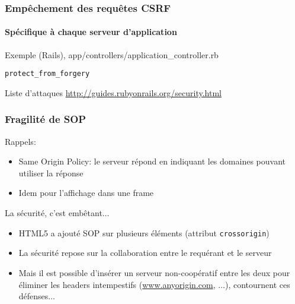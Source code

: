 \begin{reveals}
\begin{frame}
  \frametitle{Emp{\^e}chement des requ{\^e}tes CSRF}
  \framesubtitle{Sp{\'e}cifique {\`a} chaque serveur d'application}

 
    
  \pause
  \begin{block}{Exemple (Rails), app/controllers/application\_controller.rb}
    \begin{trivlist}
    \item \tt protect\_from\_forgery
    \end{trivlist}
  \end{block}

    \pause

    \begin{block}{Liste d'attaques}
      \url{http://guides.rubyonrails.org/security.html}
    \end{block}

\end{frame}



\begin{frame}
  \frametitle{Fragilit\'e{} de SOP}
  
  \begin{block}{Rappels:}
    \begin{itemize}
    \item Same Origin Policy: le serveur r\'epond en indiquant les
      domaines pouvant utiliser la r\'eponse
    \item Idem pour l'affichage dans une frame
    \end{itemize}
  \end{block}

  \pause{}
  \begin{block}{La s\'ecurit\'e, c'est emb\^etant$\ldots$}
    \begin{itemize}
    \item HTML5 a ajout\'e{} SOP sur plusieurs \'el\'ements (attribut \texttt{crossorigin})
    \item La s\'ecurit\'e repose sur la collaboration entre le requ\'erant et le serveur
    \item Mais il est possible d'ins\'erer un serveur non-coop\'eratif
      entre les deux pour \'eliminer les headers intempestifs
      (\url{www.anyorigin.com}, $\ldots$), contournent ces
      d\'efenses$\ldots$
    \end{itemize}
  \end{block}


\end{frame}
\end{reveals}
